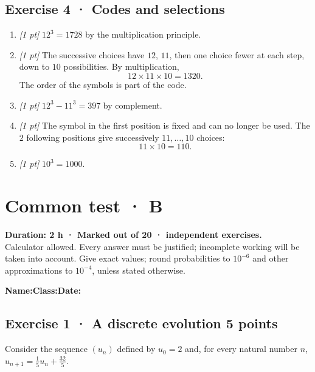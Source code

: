 \subsection*{Exercise 4 · Codes and selections}\begin{enumerate}

\item \textit{[1 pt]} $12^3=1728$ by the multiplication principle.

\item \textit{[1 pt]} The successive choices have $12$, $11$, then one choice fewer at each step, down to $10$ possibilities. By multiplication,
\[12\times11\times10=1320.\]
The order of the symbols is part of the code.

\item \textit{[1 pt]} $12^3-11^3=397$ by complement.

\item \textit{[1 pt]} The symbol in the first position is fixed and can no longer be used. The $2$ following positions give successively $11,\ldots,10$ choices:
\[11\times10=110.\]

\item \textit{[1 pt]} $10^3=1000$.

\end{enumerate}

\fi

\fi

\ifmxteacher

\mxnewpage{}\label{sujet:3-4}

\section*{Common test · B}


\textbf{Duration: 2 h · Marked out of 20 ·  independent exercises.}\\Calculator allowed. Every answer must be justified; incomplete working will be taken into account. Give exact values; round probabilities to $10^{-6}$ and other approximations to $10^{-4}$, unless stated otherwise.

\smallskip\textbf{Name:}\enspace\dotfill\quad\textbf{Class:}\enspace\dotfill\quad\textbf{Date:}\enspace\dotfill

\subsection*{Exercise 1 · A discrete evolution \hfill 5 points}Consider the sequence $(u_n)$ defined by $u_0=2$ and, for every natural number $n$, $u_{n+1}=\frac{1}{5}u_n+\frac{32}{5}$.

